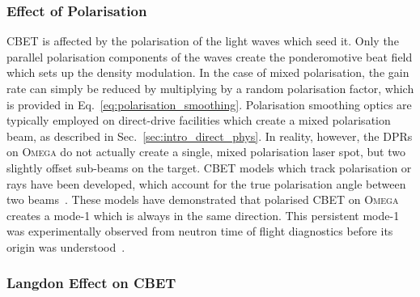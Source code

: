 \subsubsection{Effect of Polarisation}%
\label{sec:theory_cbet_polarisation}

\ac{CBET} is affected by the polarisation of the light waves which seed it.
Only the parallel polarisation components of the waves create the ponderomotive beat field which sets up the density modulation.
In the case of mixed polarisation, the gain rate can simply be reduced by multiplying by a random polarisation factor, which is provided in Eq.~\ref{eq:polarisation_smoothing}.
Polarisation smoothing optics are typically employed on direct-drive facilities which create a mixed polarisation beam, as described in Sec.~\ref{sec:intro_direct_phys}.
In reality, however, the \ac{DPRs} on \textsc{Omega} do not actually create a single, mixed polarisation laser spot, but two slightly offset sub-beams on the target.
\ac{CBET} models which track polarisation or rays have been developed, which account for the true polarisation angle between two beams~\cite{edgell_nonuniform_2021,colaitis_3d_2022,colaitis_3d_2023,colaitis_3d_2023a}.
These models have demonstrated that polarised \ac{CBET} on \textsc{Omega} creates a mode-1 which is always in the same direction.
This persistent mode-1 was experimentally observed from neutron time of flight diagnostics before its origin was understood~\cite{mannion_mitigation_2021}.

\subsubsection{Langdon Effect on CBET}%
\label{sec:theory_cbet_langdon}

